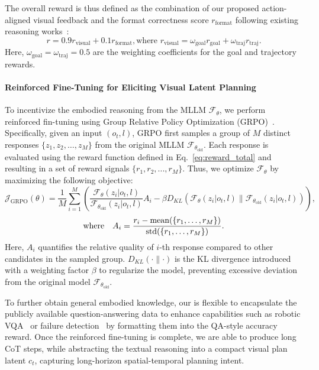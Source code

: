 The overall reward is thus defined as the combination of our proposed action-aligned visual feedback and the format correctness score $r_\text{format}$ following existing reasoning works~\cite {guo2025deepseek}:
\begin{equation}\label{eq:reward_total}
    r = 0.9 r_\text{visual} + 0.1 r_\text{format}, \text{where }r_\text{visual} = \omega_\text{goal}r_\text{goal} + \omega_\text{traj}r_\text{traj}.
\end{equation}
Here, $\omega_\text{goal} = \omega_\text{traj} = 0.5$ are the weighting coefficients for the goal and trajectory rewards.

\paragraph{Reinforced Fine-Tuning for Eliciting Visual Latent Planning}

To incentivize the embodied reasoning from the MLLM $\mathcal{F}_\theta$, we perform reinforced fin-tuning using Group Relative Policy Optimization (GRPO)~\cite{shao2024deepseekmath}.
Specifically, given an input $(o_t, l)$, GRPO first samples a group of $M$ distinct responses $\{ z_1, z_2, \ldots, z_M \}$ from the original MLLM $\mathcal{F}_{\theta_\text{old}}$. Each response is evaluated using the reward function defined in Eq.~\ref{eq:reward_total} and resulting in a set of reward signals $\{ r_1, r_2, ..., r_M \}$. Thus, we optimize $\mathcal{F}_{\theta}$ by maximizing the following objective:
\begin{equation}
    \mathcal{J}_\text{GRPO}(\theta) = \frac{1}{M} \sum_{i=1}^{M}(\frac{\mathcal{F}_{\theta}(z_i|o_t,l)}{\mathcal{F}_{\theta_\text{old}}(z_i|o_t,l)}A_i - \beta D_{KL}(\mathcal{F}_{\theta}(z_i|o_t,l)\parallel \mathcal{F}_{\theta_\text{old}}(z_i|o_t,l))),
\end{equation}
\begin{equation*}
     \\ \text{where} \quad A_i=\frac{r_i - \text{mean}(\{ r_1, \ldots, r_M \})}{\text{std}(\{ r_1, \ldots, r_M \})}.
\end{equation*}
Here, $A_i$ quantifies the relative quality of $i$-th response compared to other candidates in the sampled group. $D_{KL}(\cdot\parallel\cdot)$ is the KL divergence introduced with a weighting factor $\beta$ to regularize the model, preventing excessive deviation from the original model $\mathcal{F}_{\theta_\text{old}}$.

To further obtain general embodied knowledge, our \ours{} is flexible to encapsulate the publicly available question-answering data to enhance capabilities such as robotic VQA~\cite{sermanet2024robovqa} or failure detection~\cite{liu2023reflect} by formatting them into the QA-style accuracy reward. Once the reinforced fine-tuning is complete, we are able to produce long CoT steps, while abstracting the textual reasoning into a compact visual plan latent $c_t$, capturing long-horizon spatial-temporal planning intent.  


